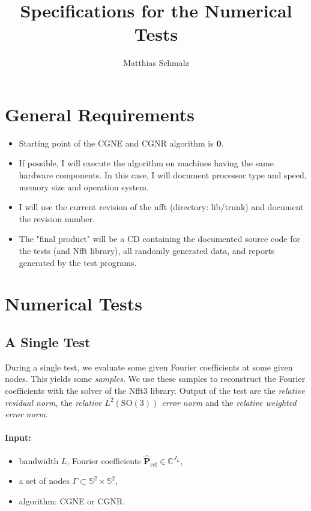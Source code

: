 \documentclass[a4paper,twoside,smallheadings,headsepline,11pt,final]{scrartcl}
\title{Specifications for the Numerical Tests}
\author{Matthias Schmalz}
\newcommand{\C}{\mathbb{C}}
\renewcommand{\S}{\mathbb{S}}
\begin{document}
\maketitle

\section{General Requirements}

\begin{itemize}
\item Starting point of the CGNE and CGNR algorithm is $\mathbf{0}$.
\item If possible, I will execute the algorithm on machines having the same hardware components.
In this case, I will document processor type and speed, memory size and operation system.
\item I will use the current revision of the nfft (directory: lib/trunk) and document the revision number.
\item The "final product" will be a CD containing the documented source code for the tests (and Nfft library), all randomly generated data, and reports generated by the test programs.
\end{itemize}

\section{Numerical Tests}
\subsection{A Single Test}

During a single test, we evaluate some given Fourier coefficients at some given nodes.
This yields some \emph{samples}.
We use these samples to reconstruct the Fourier coefficients with the solver of the Nfft3 library.
Output of the test are the \emph{relative residual norm}, the \emph{relative $L^2(\mathrm{SO}(3))$ error norm} and the \emph{relative weighted error norm}.

\paragraph*{Input:}
\begin{itemize}
\item bandwidth $L$, Fourier coefficients $\mathbf{\hat P}_{\mathrm{ref}} \in \C^{J_L}$,
\item a set of nodes $\Gamma \subset \S^2 \times \S^2$,
\item algorithm: CGNE or CGNR.
\end{itemize}
\end{document}
